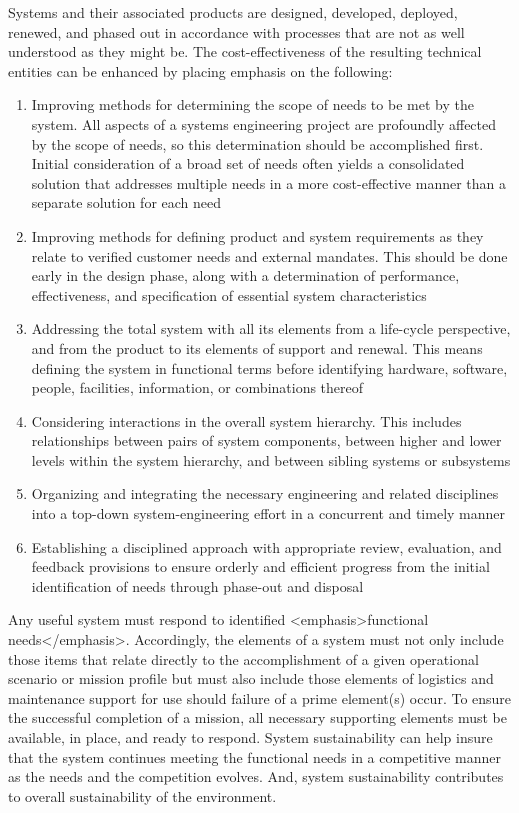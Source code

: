 Systems and their associated products are designed, developed, deployed, renewed, and phased out in accordance with processes that are not as well understood as they might be. The cost-effectiveness of the resulting technical entities can be enhanced by placing emphasis on the following:

\begin{enumerate}
\item Improving methods for determining the scope of needs to be met by the system. All aspects of a systems engineering project are profoundly affected by the scope of needs, so this determination should be accomplished first. Initial consideration of a broad set of needs often yields a consolidated solution that addresses multiple needs in a more cost-effective manner than a separate solution for each need
\item Improving methods for defining product and system requirements as they relate to verified customer needs and external mandates. This should be done early in the design phase, along with a determination of performance, effectiveness, and specification of essential system characteristics
\item Addressing the total system with all its elements from a life-cycle perspective, and from the product to its elements of support and renewal. This means defining the system in functional terms before identifying hardware, software, people, facilities, information, or combinations thereof
\item Considering interactions in the overall system hierarchy. This includes relationships between pairs of system components, between higher and lower levels within the system hierarchy, and between sibling systems or subsystems
\item Organizing and integrating the necessary engineering and related disciplines into a top-down system-engineering effort in a concurrent and timely manner
\item Establishing a disciplined approach with appropriate review, evaluation, and feedback provisions to ensure orderly and efficient progress from the initial identification of needs through phase-out and disposal
\end{enumerate}

Any useful system must respond to identified <emphasis>functional needs</emphasis>. Accordingly, the elements of a system must not only include those items that relate directly to the accomplishment of a given operational scenario or mission profile but must also include those elements of logistics and maintenance support for use should failure of a prime element(s) occur. To ensure the successful completion of a mission, all necessary supporting elements must be available, in place, and ready to respond. System sustainability can help insure that the system continues meeting the functional needs in a competitive manner as the needs and the competition evolves. And, system sustainability contributes to overall sustainability of the environment.

